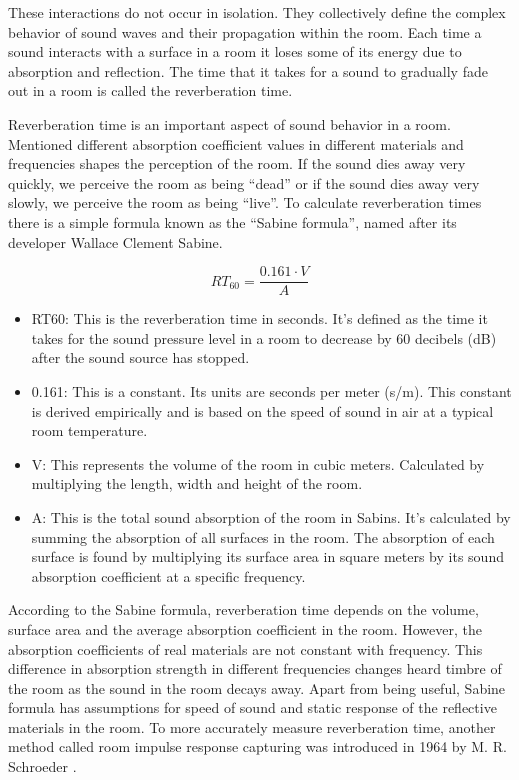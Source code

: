             These interactions do not occur in isolation. They collectively define the complex behavior of sound waves and their propagation within the room. Each time a sound interacts with a surface in a room it loses some of its energy due to absorption and reflection. The time that it takes for a sound to gradually fade out in a room is called the reverberation time.\par

            Reverberation time is an important aspect of sound behavior in a room. Mentioned different absorption coefficient values in different materials and frequencies shapes the perception of the room. If the sound dies away very quickly, we perceive the room as being “dead” or if the sound dies away very slowly, we perceive the room as being “live”. To calculate reverberation times there is a simple formula known as the “Sabine formula”, named after its developer Wallace Clement Sabine\cite{Acoustics_and_Psychophysics}.\par 
            $$RT_{60} = \frac{0.161 \cdot V}{A}$$
            \begin{itemize}
                \item RT60: This is the reverberation time in seconds. It's defined as the time it takes for the sound pressure level in a room to decrease by 60 decibels (dB) after the sound source has stopped\cite{Room_Acoustics}.
                \item 0.161: This is a constant. Its units are seconds per meter (s/m). This constant is derived empirically and is based on the speed of sound in air at a typical room temperature.
                \item V: This represents the volume of the room in cubic meters. Calculated by multiplying the length, width and height of the room.
                \item A: This is the total sound absorption of the room in Sabins. It's calculated by summing the absorption of all surfaces in the room. The absorption of each surface is found by multiplying its surface area in square meters by its sound absorption coefficient at a specific frequency.
            \end{itemize}

            According to the Sabine formula, reverberation time depends on the volume, surface area and the average absorption coefficient in the room. However, the absorption coefficients of real materials are not constant with frequency. This difference in absorption strength in different frequencies changes heard timbre of the room as the sound in the room decays away. Apart from being useful, Sabine formula has assumptions for speed of sound and static response of the reflective materials in the room. To more accurately measure reverberation time, another method called room impulse response capturing was introduced in 1964 by M. R. Schroeder \cite{New_Method_Measuring_RT}.\par

